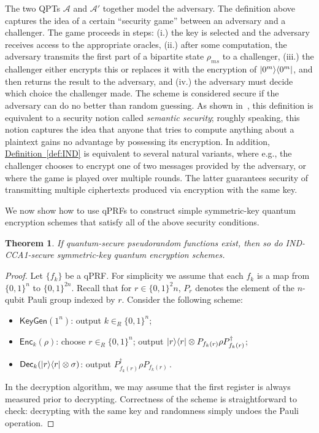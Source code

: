 \documentclass[11pt]{article}
\numberwithin{equation}{section}
\newtheorem{theorem}{Theorem}
\newcommand{\expref}[2]{\texorpdfstring{\hyperref[#2]{#1~\ref{#2}}}{#1~\ref{#2}}}
\newcommand{\algo}{\mathcal}
\newcommand{\KeyGen}{\ensuremath{\mathsf{KeyGen}}\xspace}
\newcommand{\Enc}{\ensuremath{\mathsf{Enc}}\xspace}
\newcommand{\Dec}{\ensuremath{\mathsf{Dec}}\xspace}
\newcommand{\inrand}{\in_R}
\begin{document}
{The two QPTs $\algo A$ and $\algo A'$ together model the adversary. The definition above captures the idea of a certain ``security game'' between an adversary and a challenger. The game proceeds in steps: (i.) the key is selected and the adversary receives access to the appropriate oracles, (ii.) after some computation, the adversary transmits the first part of a bipartite state $\rho_{ms}$ to a challenger, (iii.) the challenger either encrypts this or replaces it with the encryption of ${\left\vert{0^m}\right\rangle}{\left\langle{0^m}\right\vert}$, and then returns the result to the adversary, and (iv.) the adversary must decide which choice the challenger made. The scheme is considered secure if the adversary can do no better than random guessing. As shown in~\cite{ABFGSS15}, this definition is equivalent to a security notion called \emph{semantic security}; roughly speaking, this notion captures the idea that anyone that tries to compute anything about a plaintext gains no advantage by possessing its encryption. In addition, \expref{Definition}{def:IND} is equivalent to several natural variants, where e.g., the challenger chooses to encrypt one of two messages provided by the adversary, or where the game is played over multiple rounds. The latter guarantees security of transmitting multiple ciphertexts produced via encryption with the same key.

We now show how to use qPRFs to construct simple symmetric-key quantum encryption schemes that satisfy all of the above security conditions.

\begin{theorem}\label{thm:IND-CCA1}
If quantum-secure pseudorandom functions exist, then so do IND-CCA1-secure symmetric-key quantum encryption schemes.
\end{theorem}
\begin{proof}
Let $\{f_k\}$ be a qPRF. For simplicity we assume that each $f_k$ is a map from $\{0, 1\}^n$ to $\{0, 1\}^{2n}$. Recall that for $r \in \{0, 1\}^2n$, $P_r$ denotes the element of the $n$-qubit Pauli group indexed by $r$. Consider the following scheme:
\begin{itemize}
\item $\KeyGen(1^n)$: output $k \inrand \{0, 1\}^n$;
\item $\Enc_k(\rho)$: choose $r \inrand \{0, 1\}^n$; output ${\left\vert{r}\right\rangle}{\left\langle{r}\right\vert} \otimes P_{f_k(r)} \rho P_{f_k(r)}^{\dagger}$;
\item $\Dec_k(\ket{r}\bra{r} \otimes \sigma)$: output  $P_{f_k(r)}^\dagger \rho P_{f_k(r)}$\,.
\end{itemize}
In the decryption algorithm, we may assume that the first register is always measured prior to decrypting. Correctness of the scheme is straightforward to check: decrypting with the same key and randomness simply undoes the Pauli operation.


\end{proof}}
\end{document}
